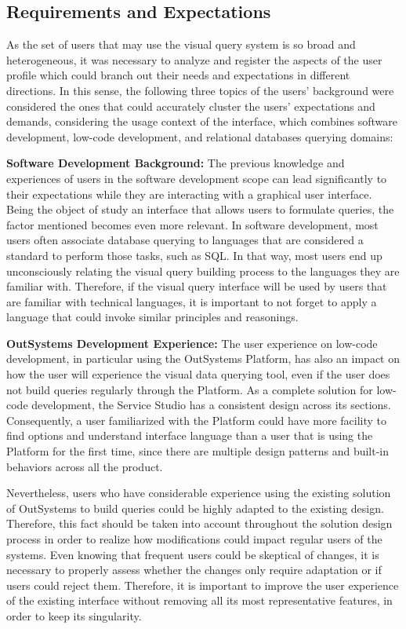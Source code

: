 \subsection{Requirements and Expectations}
\label{subsec:requirements_and_expectations}

As the set of users that may use the visual query system is so broad and heterogeneous, it was necessary to analyze and register the aspects of the user profile which could branch out their needs and expectations in different directions. In this sense, the following three topics of the users' background were considered the ones that could accurately cluster the users' expectations and demands, considering the usage context of the interface, which combines software development, low-code development, and relational databases querying domains:

\medskip

\textbf{Software Development Background:} The previous knowledge and experiences of users in the software development scope can lead significantly to their expectations while they are interacting with a graphical user interface. Being the object of study an interface that allows users to formulate queries, the factor mentioned becomes even more relevant. In software development, most users often associate database querying to languages that are considered a standard to perform those tasks, such as SQL. In that way, most users end up unconsciously relating the visual query building process to the languages they are familiar with. Therefore, if the visual query interface will be used by users that are familiar with technical languages, it is important to not forget to apply a language that could invoke similar principles and reasonings.

\medskip

\textbf{OutSystems Development Experience: } The user experience on low-code development, in particular using the OutSystems Platform, has also an impact on how the user will experience the visual data querying tool, even if the user does not build queries regularly through the Platform. As a complete solution for low-code development, the Service Studio has a consistent design across its sections. Consequently, a user familiarized with the Platform could have more facility to find options and understand interface language than a user that is using the Platform for the first time, since there are multiple design patterns and built-in behaviors across all the product.

Nevertheless, users who have considerable experience using the existing solution of OutSystems to build queries could be highly adapted to the existing design. Therefore, this fact should be taken into account throughout the solution design process in order to realize how modifications could impact regular users of the systems. Even knowing that frequent users could be skeptical of changes, it is necessary to properly assess whether the changes only require adaptation or if users could reject them. Therefore, it is important to improve the user experience of the existing interface without removing all its most representative features, in order to keep its singularity.

